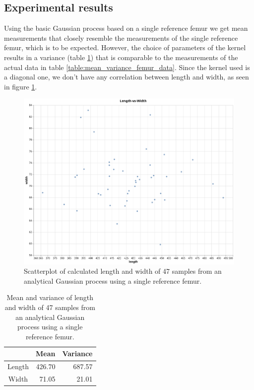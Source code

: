 \documentclass[10pt]{article}
\theoremstyle{definition}
\begin{document}
\subsection{Experimental results}
Using the basic Gaussian process based on a single reference femur we get mean measurements that closely resemble the measurements of the single reference femur, which is to be expected. However, the choice of parameters of the kernel results in a variance (table \ref{table:mean_variance_analyticalgp}) that is comparable to the measurements of the actual data in table \ref{table:mean_variance_femur_data}. Since the kernel used is a diagonal one, we don't have any correlation between length and width, as seen in
figure \ref{fig:scatterplot_analyticalgp}.

\begin{figure}[h!]
\centering
\includegraphics[scale=0.35]{screenshots/analyticalgp_scatterplot.png}
\caption{Scatterplot of calculated length and width of 47 samples from an analytical Gaussian process using a single reference femur.}
\label{fig:scatterplot_analyticalgp}
\end{figure}
\begin{table}[h!]
\centering
\begin{tabular}{c|r|r}
 & Mean & Variance \\
\hline
Length & 426.70 & 687.57 \\
Width & 71.05 & 21.01
\end{tabular}
\caption{Mean and variance of length and width of 47 samples from an analytical Gaussian process using a single reference femur.}
\label{table:mean_variance_analyticalgp}
\end{table}
\end{document}
